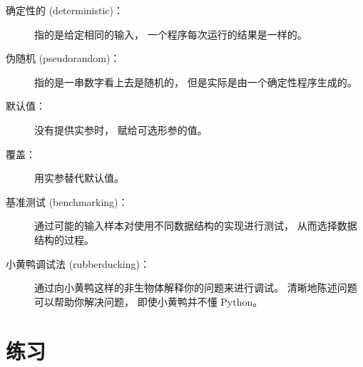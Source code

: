 {\begin{description}
\item[确定性的 (deterministic)：] 指的是给定相同的输入， 一个程序每次运行的结果是一样的。  


\item[伪随机 (pseudorandom)：] 指的是一串数字看上去是随机的， 但是实际是由一个确定性程序生成的。  


\item[默认值：] 没有提供实参时， 赋给可选形参的值。  


\item[覆盖：] 用实参替代默认值。  


\item[基准测试 (benchmarking)：] 通过可能的输入样本对使用不同数据结构的实现进行测试， 从而选择数据结构的过程。  


\item[小黄鸭调试法 (rubberducking)：] 通过向小黄鸭这样的非生物体解释你的问题来进行调试。  
    清晰地陈述问题可以帮助你解决问题， 即使小黄鸭并不懂 Python。  

\end{description}

\section{练习}
\begin{exercise}


\end{exercise}}
